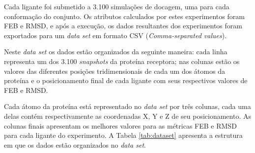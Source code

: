 Cada ligante foi submetido a 3.100 simulações de docagem, uma para cada conformação do conjunto. Os atributos calculados por estes experimentos foram FEB e RMSD, e após a execução, os dados resultantes dos experimentos foram exportados para um \emph{data set} em formato CSV (\emph{Comma-separated values}).

Neste \emph{data set} os dados estão organizados da seguinte maneira: cada linha representa um dos 3.100 \emph{snapshots} da proteína receptora; nas colunas estão os valores das diferentes posições tridimensionais de cada um dos átomos da proteína e o posicionamento final de cada ligante com seus respectivos valores de FEB e RMSD.

Cada átomo da proteína está representado no \emph{data set} por três colunas, cada uma delas contém respectivamente as coordenadas X, Y e Z de seu posicionamento. As colunas finais apresentam os melhores valores para as métricas FEB e RMSD para cada ligante do experimento. A Tabela \ref{tab:dataset} apresenta a estrutura em que os dados estão organizados no \emph{data set}.

